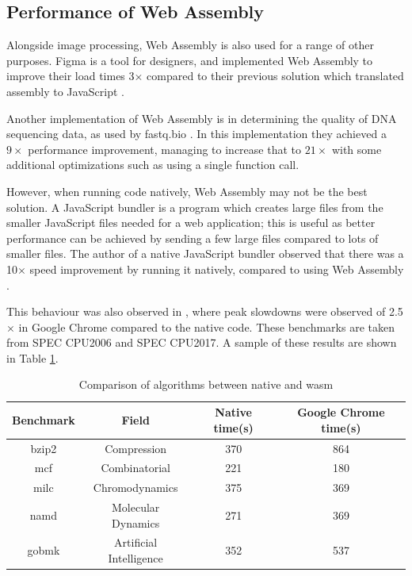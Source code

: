\documentclass[12pt,a4paper]{article}
\begin{document}
\subsection{Performance of Web Assembly}

Alongside image processing, Web Assembly is also used for a range of other purposes. Figma is a tool for designers, and implemented Web Assembly to improve their load times 3$\times$ compared to their previous solution which translated assembly to JavaScript \cite{figmawasm}.

Another implementation of Web Assembly is in determining the quality of DNA sequencing data, as used by fastq.bio \cite{fastq}. In this implementation they achieved a $9\times $ performance improvement, managing to increase that to $21 \times$ with some additional optimizations such as using a single function call.


However, when running code natively, Web Assembly may not be the best solution. A JavaScript bundler is a program which creates large files from the smaller JavaScript files needed for a web application; this is useful as better performance can be achieved by sending a few large files compared to lots of smaller files. The author of a native JavaScript bundler observed that there was a 10$\times$ speed improvement by running it natively, compared to using Web Assembly \cite{esbuild}.

This behaviour was also observed in \cite{jangda2019not}, where peak slowdowns were observed of 2.5$\times$ in Google Chrome compared to the native code. These benchmarks are taken from SPEC CPU2006 and SPEC CPU2017. A sample of these results are shown in Table \ref{native}.
\begin{table}[H]
    \centering
    \caption{Comparison of algorithms between native and wasm}
    \vspace*{6pt}
    \label{native}
    \begin{tabular}{cccc}\hline\hline
        Benchmark & Field                   & Native time(s) & Google Chrome time(s) \\ \hline
        bzip2     & Compression             & 370            & 864                   \\
        mcf       & Combinatorial           & 221            & 180                   \\
        milc      & Chromodynamics          & 375            & 369                   \\
        namd      & Molecular Dynamics      & 271            & 369                   \\
        gobmk     & Artificial Intelligence & 352            & 537
    \end{tabular}
\end{table}
\end{document}
